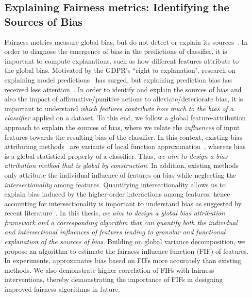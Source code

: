 \subsection*{Explaining Fairness metrics: Identifying the Sources of Bias}
Fairness metrics measure global bias, but do not detect or explain its sources~\cite{begley2020explainability,lundberg2020explaining,pan2021explaining}.
In order to diagnose the emergence of bias in the predictions of classifier, it is important to compute explanations, such as how different features attribute to the global bias. Motivated by the GDPR's ``right to explanation", research on explaining model predictions~\cite{ribeiro2016should,lundberg2017unified,lundberg2020local2global} has surged, but explaining prediction bias has received less attention~\cite{begley2020explainability,lundberg2020explaining}. In order to identify and explain the sources of bias and also the impact of affirmative/punitive actions to alleviate/deteriorate bias, it is important to understand \textit{which features contribute how much to the bias of a classifier} applied on a dataset. To this end, we follow a global feature-attribution approach to explain the sources of bias, where we relate the \emph{influences} of input features towards the resulting bias of the classifier. In this context, existing bias attributing methods~\cite{begley2020explainability,lundberg2020explaining} are variants of local function approximation~\cite{sliwinski2019axiomatic}, whereas bias is a global statistical property of a classifier. Thus, \textit{we aim to design a bias attribution method that is global by construction}. In addition, existing methods only attribute the individual influence of features on bias while neglecting the \textit{intersectionality} among features. Quantifying intersectionality allows us to explain bias induced by the higher-order interactions among features; hence accounting for intersectionality is important to understand bias as suggested by recent literature~\cite{buolamwini2018gender,wang2022towards}. In this thesis, \textit{we aim to design a global bias attribution framework and a corresponding algorithm that can quantify both the individual and intersectional influences of features leading to granular and functional explanation of the sources of bias.} Building on global variance decomposition, we propose an algorithm {\fairXplainer} to estimate the fairness influence function (FIF) of features. In experiments, {\fairXplainer} approximates bias based on FIFs more accurately than existing methods. We also demonstrate higher correlation of FIFs with fairness interventions, thereby demonstrating the importance of FIFs in designing improved fairness algorithms in future.

